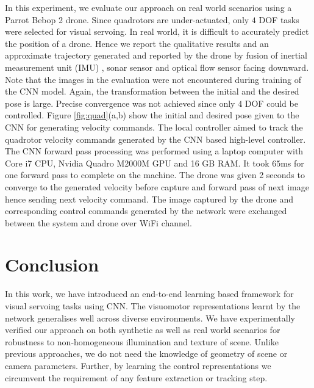 \documentclass[usletter, 10 pt, conference]{ieeeconf}  %
\begin{document}
In this experiment, we evaluate our approach on real world scenarios using a Parrot Bebop 2 drone. Since quadrotors are under-actuated, only $4$ DOF tasks were selected for visual servoing. In real world, it is difficult to accurately predict the position of a drone. Hence we report the qualitative results and an approximate trajectory generated and reported by the drone by fusion of inertial measurement unit (IMU) , sonar sensor and optical flow sensor facing downward. Note that the images in the evaluation were not encountered during training of the CNN model. Again, the transformation between the initial and the desired pose is large. Precise convergence was not achieved since only $4$ DOF could be controlled. Figure \ref{fig:quad}(a,b) show the initial and desired pose given to the CNN for generating velocity commands. The local controller aimed to track the quadrotor velocity commands generated by the CNN based  high-level controller. The CNN forward pass processing was performed using a laptop computer with Core i7 CPU, Nvidia Quadro M2000M GPU and 16 GB RAM. It took $65$ms for one forward pass to complete on the machine. The drone was given 2 seconds to converge to the generated velocity before capture and forward pass of next image hence sending next velocity command. The image captured by the drone and corresponding control commands generated by the network were exchanged between the system and drone over WiFi channel.

\section{Conclusion}
In this work, we have introduced an end-to-end learning based framework for visual servoing tasks using CNN. The visuomotor representations learnt by the network generalises well across diverse environments. We have experimentally verified our approach on both synthetic as well as real world scenarios for robustness to non-homogeneous illumination and texture of scene. Unlike previous approaches, we do not need the knowledge of geometry of scene or camera parameters. Further, by learning the control representations we circumvent the requirement of any feature extraction or tracking step.


\end{document}
